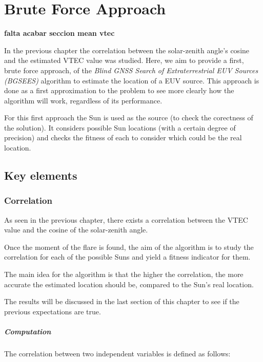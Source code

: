 \chapter{Brute Force Approach}

\textbf{falta acabar seccion mean vtec}

In the previous chapter the correlation between the solar-zenith angle's cosine and the estimated VTEC value was studied. Here, we aim to provide a first, brute force approach, of the \textit{Blind GNSS Search of Extraterrestrial EUV Sources (BGSEES)} algorithm to estimate the location of a EUV source. This approach is done as a first approximation to the problem to see more clearly how the algorithm will work, regardless of its performance.

For this first approach the Sun is used as the source (to check the corectness of the solution). It considers possible Sun locations (with a certain degree of precision) and checks the fitness of each to consider which could be the real location.

\section{Key elements}

\subsection{Correlation}

As seen in the previous chapter, there exists a correlation between the VTEC value and the cosine of the solar-zenith angle. 

Once the moment of the flare is found, the aim of the algorithm is to study the correlation for each of the possible Suns and yield a fitness indicator for them. 

The main idea for the algorithm is that the higher the correlation, the more accurate the estimated location should be, compared to the Sun's real location. 

The results will be discussed in the last section of this chapter to see if the previous expectations are true.

\paragraph{Computation}

The correlation between two independent variables is defined as follows:

